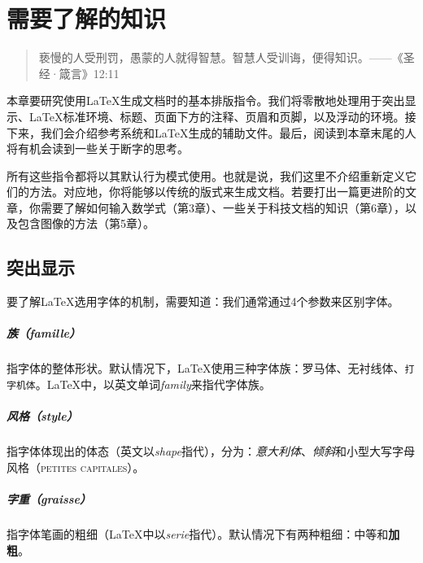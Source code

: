 \chapter{需要了解的知识}

\begin{quote}
    亵慢的人受刑罚，愚蒙的人就得智慧。智慧人受训诲，便得知识。——《圣经·箴言》12:11
\end{quote}


本章要研究使用\LaTeX 生成文档时的基本排版指令。我们将零散地处理用于突出显示、\LaTeX 标准环境、标题、页面下方的注释、页眉和页脚，以及浮动的环境。接下来，我们会介绍参考系统和\LaTeX 生成的辅助文件。最后，阅读到本章末尾的人将有机会读到一些关于断字的思考。

所有这些指令都将以其默认行为模式使用。也就是说，我们这里不介绍重新定义它们的方法。对应地，你将能够以传统的版式来生成文档。若要打出一篇更进阶的文章，你需要了解如何输入数学式（第3章）、一些关于科技文档的知识（第6章），以及包含图像的方法（第5章）。

\section{突出显示}

要了解\LaTeX 选用字体的机制，需要知道：我们通常通过4个参数来区别字体。

\paragraph*{族（famille）}指字体的整体形状。默认情况下，\LaTeX 使用三种字体族：罗马体、\textsf{无衬线体}、\texttt{打字机体}。\LaTeX 中，以英文单词\textit{family}来指代字体族。

\paragraph*{风格（style）}指字体体现出的体态（英文以\textit{shape}指代），分为：\textit{意大利体}、\textsl{倾斜}和\textsc{小型大写字母风格（petites capitales）}。

\paragraph*{字重（graisse）}指字体笔画的粗细（\LaTeX 中以\textit{serie}指代）。默认情况下有两种粗细：中等和\textbf{加粗}。

